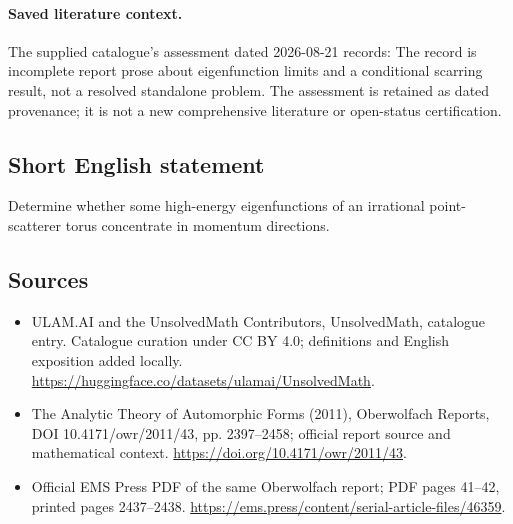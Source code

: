 \documentclass[11pt]{article}
\begin{document}
\paragraph{Saved literature context.} The supplied catalogue's assessment dated 2026-08-21 records: The record is incomplete report prose about eigenfunction limits and a conditional scarring result, not a resolved standalone problem. The assessment is retained as dated provenance; it is not a new comprehensive literature or open-status certification.
\subsection{Short English statement}
Determine whether some high-energy eigenfunctions of an irrational point-scatterer torus concentrate in momentum directions.
\subsection{Sources}
\begin{itemize}
\item[\hypertarget{source:statement:1}{S1}] ULAM.AI and the UnsolvedMath Contributors, UnsolvedMath, catalogue entry. Catalogue curation under CC BY 4.0; definitions and English exposition added locally.
\url{https://huggingface.co/datasets/ulamai/UnsolvedMath}.
\item[\hypertarget{source:statement:2}{S2}] The Analytic Theory of Automorphic Forms (2011), Oberwolfach Reports, DOI 10.4171/owr/2011/43, pp. 2397--2458; official report source and mathematical context.
\url{https://doi.org/10.4171/owr/2011/43}.
\item[\hypertarget{source:statement:3}{S3}] Official EMS Press PDF of the same Oberwolfach report; PDF pages 41--42, printed pages 2437--2438.
\url{https://ems.press/content/serial-article-files/46359}.
\end{itemize}
\label{end:statement}
\end{document}
